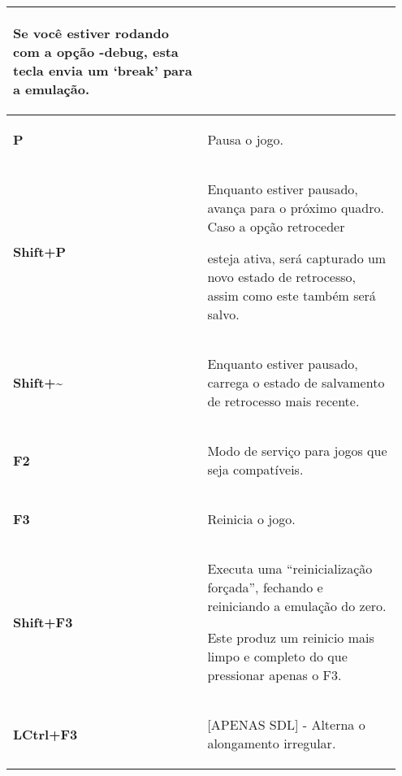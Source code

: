 \documentclass[letterpaper,10pt,brazil]{sphinxmanual}
\begin{document}
\begin{longtable}{|p{0.475\linewidth}|p{0.475\linewidth}|}
\begin{DUlineblock}{0em}
\item[] 
\item[] Se você estiver rodando com a opção \textbf{-debug}, esta tecla envia um `break' para a emulação.
\end{DUlineblock}
\\
\hline
\textbf{P}
&
\begin{DUlineblock}{0em}
\item[] Pausa o jogo.
\end{DUlineblock}
\\
\hline
\textbf{Shift+P}
&
\begin{DUlineblock}{0em}
\item[] Enquanto estiver pausado, avança para o próximo quadro. Caso a opção retroceder
\item[] esteja ativa, será capturado um novo estado de retrocesso, assim como este também será salvo.
\end{DUlineblock}
\\
\hline
\textbf{Shift+\textasciitilde{}}
&
\begin{DUlineblock}{0em}
\item[] Enquanto estiver pausado, carrega o estado de salvamento de retrocesso mais recente.
\end{DUlineblock}
\\
\hline
\textbf{F2}
&
\begin{DUlineblock}{0em}
\item[] Modo de serviço para jogos que seja compatíveis.
\end{DUlineblock}
\\
\hline
\textbf{F3}
&
\begin{DUlineblock}{0em}
\item[] Reinicia o jogo.
\end{DUlineblock}
\\
\hline
\textbf{Shift+F3}
&
\begin{DUlineblock}{0em}
\item[] Executa uma ``reinicialização forçada'', fechando e reiniciando a emulação do zero.
\item[] Este produz um reinicio mais limpo e completo do que pressionar apenas o F3.
\end{DUlineblock}
\\
\hline
\textbf{LCtrl+F3}
&
\begin{DUlineblock}{0em}
\item[] {[}APENAS SDL{]} - Alterna o alongamento irregular.
\end{DUlineblock}
\\

\end{longtable}
\end{document}
